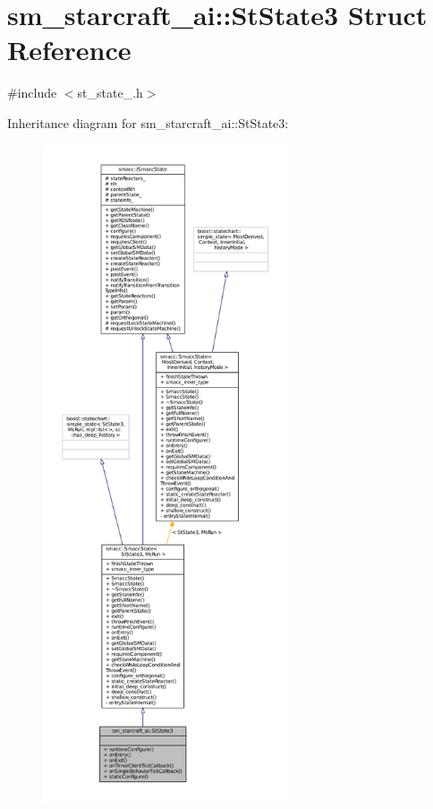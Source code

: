 \hypertarget{structsm__starcraft__ai_1_1StState3}{}\section{sm\+\_\+starcraft\+\_\+ai\+:\+:St\+State3 Struct Reference}
\label{structsm__starcraft__ai_1_1StState3}


{\ttfamily \#include $<$st\+\_\+state\+\_.\+h$>$}



Inheritance diagram for sm\+\_\+starcraft\+\_\+ai\+:\+:St\+State3\+:
\nopagebreak
\begin{figure}[H]
\begin{center}
\leavevmode
\includegraphics[height=550pt]{structsm__starcraft__ai_1_1StState3__inherit__graph}
\end{center}
\end{figure}


